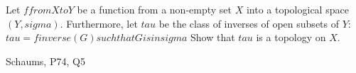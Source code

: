 \begin{samepage}
\begin{ex}
Let $f from X to Y$ be a function from a non-empty set $X$ into a topological space $(Y, sigma)$.
Furthermore, let $tau$ be the class of inverses of open subsets of $Y$:
$tau = {{ f inverse (G) such that G is in sigma }} $
Show that $tau$ is a topology on $X$.
\end{ex}
\begin{source}
Schaums, P74, Q5
\end{source}
\end{samepage}
